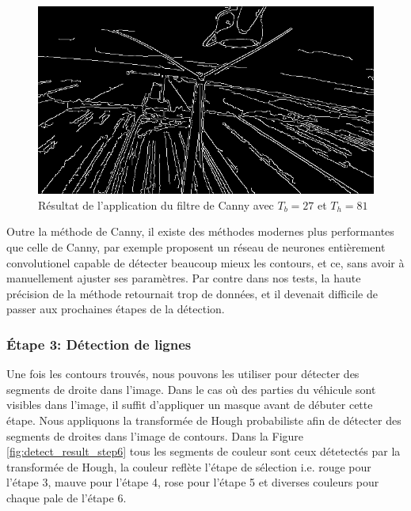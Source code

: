 
\begin{figure}[htp]
  \centering
  \includegraphics[width=0.6\linewidth]{images/canny.png}
  \caption{Résultat de l'application du filtre de Canny avec $T_b = 27$ et $T_h = 81$}
  \label{fig:canny}
\end{figure}

Outre la méthode de Canny, il existe des méthodes modernes plus performantes que celle de Canny, par exemple \citep{Xie2015} proposent un réseau de neurones entièrement convolutionel capable de détecter beaucoup mieux les contours, et ce, sans avoir à manuellement ajuster ses paramètres. Par contre dans nos tests, la haute précision de la méthode retournait trop de données, et il devenait difficile de passer aux prochaines étapes de la détection.

\subsubsection{Étape 3: Détection de lignes}

Une fois les contours trouvés, nous pouvons les utiliser pour détecter des segments de droite dans l'image. Dans le cas où des parties du véhicule sont visibles dans l'image, il suffit d'appliquer un masque avant de débuter cette étape. Nous appliquons la transformée de Hough probabiliste \citep{Matas2000} afin de détecter des segments de droites dans l'image de contours. Dans la Figure \ref{fig:detect_result_step6} tous les segments de couleur sont ceux détetectés par la transformée de Hough, la couleur reflète l'étape de sélection i.e. rouge pour l'étape 3, mauve pour l'étape 4, rose pour l'étape 5 et diverses couleurs pour chaque pale de l'étape 6.

